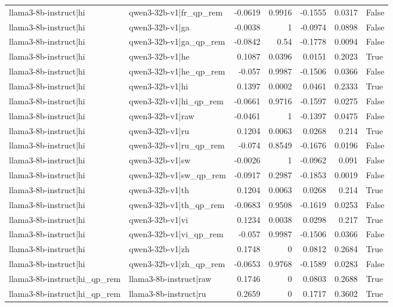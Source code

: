 \begin{table}
\begin{tabular}{l l r r r r l}
llama3-8b-instruct|hi & qwen3-32b-v1|fr_qp_rem & -0.0619 & 0.9916 & -0.1555 & 0.0317 & False \\
llama3-8b-instruct|hi & qwen3-32b-v1|ga & -0.0038 & 1 & -0.0974 & 0.0898 & False \\
llama3-8b-instruct|hi & qwen3-32b-v1|ga_qp_rem & -0.0842 & 0.54 & -0.1778 & 0.0094 & False \\
llama3-8b-instruct|hi & qwen3-32b-v1|he & 0.1087 & 0.0396 & 0.0151 & 0.2023 & True \\
llama3-8b-instruct|hi & qwen3-32b-v1|he_qp_rem & -0.057 & 0.9987 & -0.1506 & 0.0366 & False \\
llama3-8b-instruct|hi & qwen3-32b-v1|hi & 0.1397 & 0.0002 & 0.0461 & 0.2333 & True \\
llama3-8b-instruct|hi & qwen3-32b-v1|hi_qp_rem & -0.0661 & 0.9716 & -0.1597 & 0.0275 & False \\
llama3-8b-instruct|hi & qwen3-32b-v1|raw & -0.0461 & 1 & -0.1397 & 0.0475 & False \\
llama3-8b-instruct|hi & qwen3-32b-v1|ru & 0.1204 & 0.0063 & 0.0268 & 0.214 & True \\
llama3-8b-instruct|hi & qwen3-32b-v1|ru_qp_rem & -0.074 & 0.8549 & -0.1676 & 0.0196 & False \\
llama3-8b-instruct|hi & qwen3-32b-v1|sw & -0.0026 & 1 & -0.0962 & 0.091 & False \\
llama3-8b-instruct|hi & qwen3-32b-v1|sw_qp_rem & -0.0917 & 0.2987 & -0.1853 & 0.0019 & False \\
llama3-8b-instruct|hi & qwen3-32b-v1|th & 0.1204 & 0.0063 & 0.0268 & 0.214 & True \\
llama3-8b-instruct|hi & qwen3-32b-v1|th_qp_rem & -0.0683 & 0.9508 & -0.1619 & 0.0253 & False \\
llama3-8b-instruct|hi & qwen3-32b-v1|vi & 0.1234 & 0.0038 & 0.0298 & 0.217 & True \\
llama3-8b-instruct|hi & qwen3-32b-v1|vi_qp_rem & -0.057 & 0.9987 & -0.1506 & 0.0366 & False \\
llama3-8b-instruct|hi & qwen3-32b-v1|zh & 0.1748 & 0 & 0.0812 & 0.2684 & True \\
llama3-8b-instruct|hi & qwen3-32b-v1|zh_qp_rem & -0.0653 & 0.9768 & -0.1589 & 0.0283 & False \\
llama3-8b-instruct|hi_qp_rem & llama3-8b-instruct|raw & 0.1746 & 0 & 0.0803 & 0.2688 & True \\
llama3-8b-instruct|hi_qp_rem & llama3-8b-instruct|ru & 0.2659 & 0 & 0.1717 & 0.3602 & True \\

\end{tabular}
\end{table}
